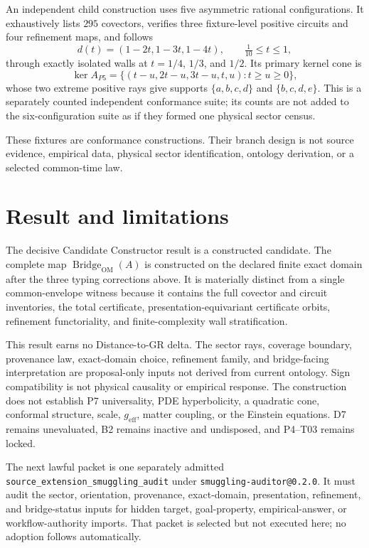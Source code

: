 \documentclass[11pt]{article}
\newcommand{\Bridge}{\operatorname{Bridge}_{\mathrm{OM}}}
\begin{document}
An independent child construction uses five asymmetric rational
configurations.  It exhaustively lists $295$ covectors, verifies three
fixture-level positive circuits and four refinement maps, and follows
\[
 d(t)=(1-2t,1-3t,1-4t),\qquad \tfrac{1}{10}\le t\le1,
\]
through exactly isolated walls at $t=1/4$, $1/3$, and $1/2$.  Its primary
kernel cone is
\[
 \ker A_{P5}=\{(t-u,2t-u,3t-u,t,u):t\ge u\ge0\},
\]
whose two extreme positive rays give supports
$\{a,b,c,d\}$ and $\{b,c,d,e\}$.  This is a separately counted independent
conformance suite; its counts are not added to the six-configuration suite as
if they formed one physical sector census.

These fixtures are conformance constructions.  Their branch design is not
source evidence, empirical data, physical sector identification, ontology
derivation, or a selected common-time law.

\section{Result and limitations}

The decisive Candidate Constructor result is a constructed candidate.  The
complete map $\Bridge(A)$ is constructed
on the declared finite exact domain after the three typing corrections above.
It is materially distinct from a single common-envelope witness because it
contains the full covector and circuit inventories, the total certificate,
presentation-equivariant certificate orbits, refinement functoriality, and
finite-complexity wall stratification.

This result earns no Distance-to-GR delta.  The sector rays, coverage boundary,
provenance law, exact-domain choice, refinement family, and bridge-facing
interpretation are proposal-only inputs not derived from current ontology.
Sign compatibility is not physical causality or empirical response.  The
construction does not establish P7 universality, PDE hyperbolicity, a quadratic
cone, conformal structure, scale, $g_{\mathrm{eff}}$, matter coupling, or the
Einstein equations.  D7 remains unevaluated, B2 remains inactive and
undisposed, and P4--T03 remains locked.

The next lawful packet is one separately admitted
\texttt{source\_extension\_smuggling\_audit} under
\texttt{smuggling-auditor@0.2.0}.  It must audit the sector, orientation,
provenance, exact-domain, presentation, refinement, and bridge-status inputs for
hidden target, goal-property, empirical-answer, or workflow-authority imports.
That packet is selected but not executed here; no adoption follows
automatically.
\end{document}
